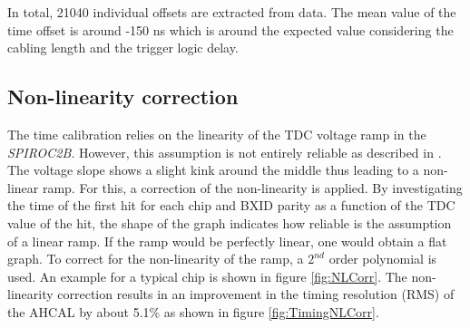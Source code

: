 \documentclass{JINST}
\begin{document}
In total, 21040 individual offsets are extracted from data. The mean value of the time offset is around -150 ns which is around the expected value considering the cabling length and the trigger logic delay.

\subsection{Non-linearity correction}
\label{sec:Non-linCorr}

The time calibration relies on the linearity of the TDC voltage ramp in the \textit{SPIROC2B}. However, this assumption is not entirely reliable as described in \cite{Hartbrich2011, Brianne2012}. The voltage slope shows a slight kink around the middle thus leading to a non-linear ramp. For this, a correction of the non-linearity is applied. By investigating the time of the first hit for each chip and BXID parity as a function of the TDC value of the hit, the shape of the graph indicates how reliable is the assumption of a linear ramp. If the ramp would be perfectly linear, one would obtain a flat graph. To correct for the non-linearity of the ramp, a $2^{nd}$ order polynomial is used. An example for a typical chip is shown in figure \ref{fig:NLCorr}. The non-linearity correction results in an improvement in the timing resolution (RMS) of the AHCAL by about 5.1\% as shown in figure \ref{fig:TimingNLCorr}.
\end{document}
